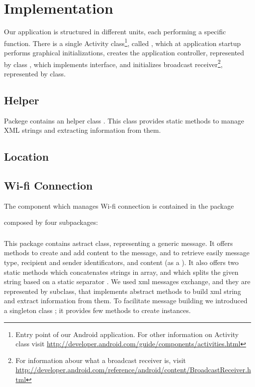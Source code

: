 \section{Implementation}
\label{sec:implementation}

Our application is structured in different units, each performing a specific function. There is a single Activity class\footnote{Entry point of our Android application. For other information on Activity class visit \url{http://developer.android.com/guide/components/activities.html}}, called , which at application startup performs graphical initializations, creates the application controller, represented by class , which implements  interface, and initializes broadcast receiver\footnote{For information abour what a broadcast receiver is, visit \url{http://developer.android.com/reference/android/content/BroadcastReceiver.html}}, represented by  class.

\subsection{Helper}
Packege  contains an helper class . This class provides static methods to manage XML strings and extracting information from them.

\subsection{Location}

\subsection{Wi-fi Connection}
The component which manages Wi-fi connection is contained in the package \begin{center}\end{center} composed by four subpackages:
	\\
	\subsubsection{}
	This package contains  astract class, representing a generic message. It offers methods to create and add content to the message, and to retrieve easily message type, recipient and sender identificators, and content (as a ). It also offers two static methods  which concatenates strings in  array, and  which splits the given string based on a static separator . 
	We used xml messages exchange, and they are represented by  subclass, that implements  abstract methods to build xml string and extract information from them. To facilitate message building we introduced a singleton class ; it provides few methods to create  instances.
	\hfill\\
